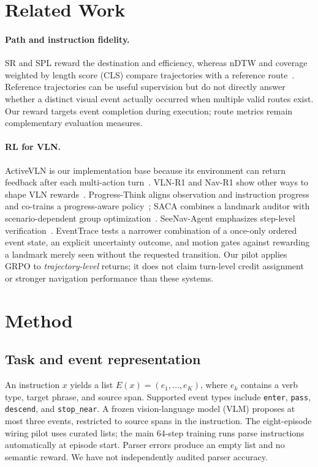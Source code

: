 \documentclass[10pt,twocolumn,letterpaper]{article}
\begin{document}
\section{Related Work}
\paragraph{Path and instruction fidelity.} SR and SPL reward the destination and efficiency, whereas nDTW and coverage weighted by length score (CLS) compare trajectories with a reference route~\cite{ilharco2019ndtw,jain2019cls}. Reference trajectories can be useful supervision but do not directly answer whether a distinct visual event actually occurred when multiple valid routes exist. Our reward targets event completion during execution; route metrics remain complementary evaluation measures.

\paragraph{RL for VLN.} ActiveVLN is our implementation base because its environment can return feedback after each multi-action turn~\cite{zhang2025activevln}. VLN-R1 and Nav-R1 show other ways to shape VLN rewards~\cite{qi2025vlnr1,liu2025navr1}. Progress-Think aligns observation and instruction progress and co-trains a progress-aware policy~\cite{wang2026progressthink}; SACA combines a landmark auditor with scenario-dependent group optimization~\cite{li2026saca}. SeeNav-Agent emphasizes step-level verification~\cite{wang2025seenav}. EventTrace tests a narrower combination of a once-only ordered event state, an explicit uncertainty outcome, and motion gates against rewarding a landmark merely seen without the requested transition. Our pilot applies GRPO to \emph{trajectory-level} returns; it does not claim turn-level credit assignment or stronger navigation performance than these systems.

\section{Method}
\subsection{Task and event representation}
An instruction $x$ yields a list $E(x)=(e_1,\ldots,e_K)$, where $e_k$ contains a verb type, target phrase, and source span. Supported event types include \texttt{enter}, \texttt{pass}, \texttt{descend}, and \texttt{stop\_near}. A frozen vision-language model (VLM) proposes at most three events, restricted to source spans in the instruction. The eight-episode wiring pilot uses curated lists; the main 64-step training runs parse instructions automatically at episode start. Parser errors produce an empty list and no semantic reward. We have not independently audited parser accuracy.
\end{document}
